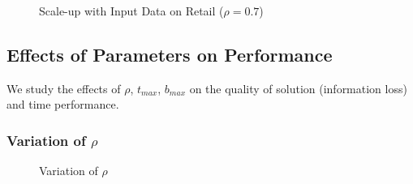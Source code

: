 \begin{figure}[th]
\centering
{}
\caption{Scale-up with Input Data on Retail ($\rho=0.7$)}\label{fig:scale}
\end{figure}

\subsection{Effects of Parameters on Performance}\label{sec:eval:effect}
We study the effects of $\rho$, $t_{max}$, $b_{max}$ on the
quality of solution (information loss) and time performance.

\subsubsection{Variation of $\rho$}
\label{sec:rho}
\begin{figure}[th]
\centering
{}
\caption{Variation of $\rho$}\label{fig:rho}
\end{figure}

